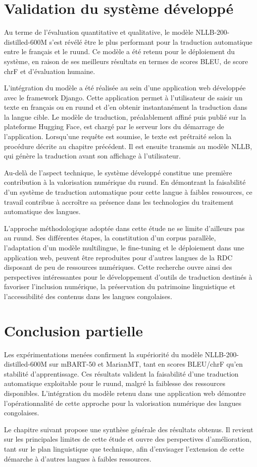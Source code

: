 \section{Validation du système développé}

Au terme de l'évaluation quantitative et qualitative, le modèle NLLB-200-distilled-600M s'est révélé être le plus performant pour la traduction automatique entre le français et le ruund. Ce modèle a été retenu pour le déploiement du système, en raison de ses meilleurs résultats en termes de scores BLEU, de score chrF et d'évaluation humaine.

L'intégration du modèle a été réalisée au sein d'une application web développée avec le framework Django. Cette application permet à l'utilisateur de saisir un texte en français ou en ruund et d'en obtenir instantanément la traduction dans la langue cible. Le modèle de traduction, préalablement affiné puis publié sur la plateforme Hugging Face, est chargé par le serveur lors du démarrage de l'application. Lorsqu'une requête est soumise, le texte est prétraité selon la procédure décrite au chapitre précédent. Il est ensuite transmis au modèle NLLB, qui génère la traduction avant son affichage à l'utilisateur.

Au-delà de l'aspect technique, le système développé constitue une première contribution à la valorisation numérique du ruund. En démontrant la faisabilité d'un système de traduction automatique pour cette langue à faibles ressources, ce travail contribue à accroître sa présence dans les technologies du traitement automatique des langues.

L'approche méthodologique adoptée dans cette étude ne se limite d'ailleurs pas au ruund. Ses différentes étapes, la constitution d'un corpus parallèle, l'adaptation d'un modèle multilingue, le fine-tuning et le déploiement dans une application web, peuvent être reproduites pour d'autres langues de la \ac{RDC} disposant de peu de ressources numériques. Cette recherche ouvre ainsi des perspectives intéressantes pour le développement d'outils de traduction destinés à favoriser l'inclusion numérique, la préservation du patrimoine linguistique et l'accessibilité des contenus dans les langues congolaises.

\section{Conclusion partielle}
Les expérimentations menées confirment la supériorité du modèle NLLB-200-distilled-600M sur mBART-50 et MarianMT, tant en scores BLEU/chrF qu'en stabilité d'apprentissage. Ces résultats valident la faisabilité d'une traduction automatique exploitable pour le ruund, malgré la faiblesse des ressources disponibles. L'intégration du modèle retenu dans une application web démontre l'opérationnalité de cette approche pour la valorisation numérique des langues congolaises.

Le chapitre suivant propose une synthèse générale des résultats obtenus. Il revient sur les principales limites de cette étude et ouvre des perspectives d'amélioration, tant sur le plan linguistique que technique, afin d'envisager l'extension de cette démarche à d'autres langues à faibles ressources.